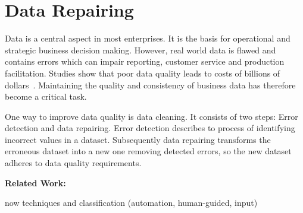 
\section{Data Repairing}\label{sec:introduction}
  Data is a central aspect in most enterprises.
  It is the basis for operational and strategic business decision making.
  However, real world data is flawed and contains errors which can impair reporting, customer service and production facilitation.
  Studies show that poor data quality leads to costs of billions of dollars~\cite{Redman:quality_disaster, cost_of_low_qual}.
  Maintaining the quality and consistency of business data has therefore become a critical task.

  One way to improve data quality is data cleaning.
  It consists of two steps: Error detection and data repairing.
  Error detection describes to process of identifying incorrect values in a dataset.
  Subsequently data repairing transforms the erroneous dataset into a new one removing detected errors, so the new dataset adheres to data quality requirements.
  
  \textbf{Related Work:}

  now techniques and classification (automation, human-guided, input)

